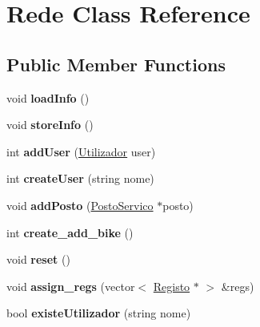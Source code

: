 \hypertarget{class_rede}{\section{Rede Class Reference}
\label{class_rede}
}
\subsection*{Public Member Functions}
\begin{DoxyCompactItemize}
\item 
\hypertarget{class_rede_a1751f922073f6172ba676a56959a1540}{void {\bfseries load\+Info} ()}\label{class_rede_a1751f922073f6172ba676a56959a1540}

\item 
\hypertarget{class_rede_abec1da6660663cd58e6851737219959e}{void {\bfseries store\+Info} ()}\label{class_rede_abec1da6660663cd58e6851737219959e}

\item 
\hypertarget{class_rede_ae78851a9d7efe2a9e0d2ead64f68ef73}{int {\bfseries add\+User} (\hyperlink{class_utilizador}{Utilizador} user)}\label{class_rede_ae78851a9d7efe2a9e0d2ead64f68ef73}

\item 
\hypertarget{class_rede_a39d746dc37d11b8c870701a3afa9328e}{int {\bfseries create\+User} (string nome)}\label{class_rede_a39d746dc37d11b8c870701a3afa9328e}

\item 
\hypertarget{class_rede_a00b09749f19ec7535127e75531281511}{void {\bfseries add\+Posto} (\hyperlink{class_posto_servico}{Posto\+Servico} $\ast$posto)}\label{class_rede_a00b09749f19ec7535127e75531281511}

\item 
\hypertarget{class_rede_a4177da39d4aa05cd0451d52a7220b7c5}{int {\bfseries create\+\_\+add\+\_\+bike} ()}\label{class_rede_a4177da39d4aa05cd0451d52a7220b7c5}

\item 
\hypertarget{class_rede_adec8c4515163174c0fab8068e36c6cc5}{void {\bfseries reset} ()}\label{class_rede_adec8c4515163174c0fab8068e36c6cc5}

\item 
\hypertarget{class_rede_ad38e26e59622727f978b995f6b9955c5}{void {\bfseries assign\+\_\+regs} (vector$<$ \hyperlink{class_registo}{Registo} $\ast$ $>$ \&regs)}\label{class_rede_ad38e26e59622727f978b995f6b9955c5}

\item 
\hypertarget{class_rede_a42b5a88380e63b78e5c99894aee0dfbc}{bool {\bfseries existe\+Utilizador} (string nome)}\label{class_rede_a42b5a88380e63b78e5c99894aee0dfbc}


\end{DoxyCompactItemize}
